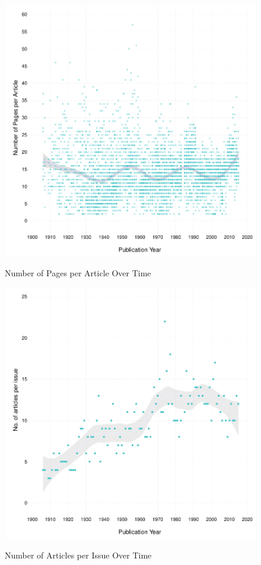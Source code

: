 \documentclass[12pt]{article}
\begin{document}
\begin{figure}[htbp]
\centering
\caption{Number of Pages per Article Over Time}
\includegraphics[scale=.85]{../figs/n_pages_per_article_over_time.pdf}
\label{fig:pages}
\end{figure}

\begin{figure}[htbp]
\centering
\caption{Number of Articles per Issue Over Time}
\includegraphics[scale=.85]{../figs/articles_per_issue_over_time.pdf}
\label{fig:narticles}
\end{figure}
\end{document}
